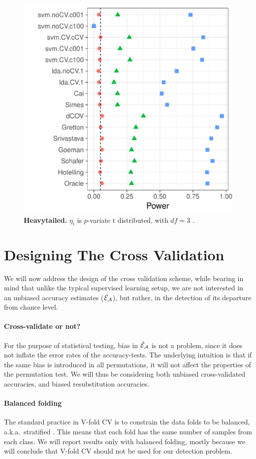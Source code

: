 \documentclass[oupdraft]{bio}
\begin{document}
\begin{figure}[th]
	\centering
	\includegraphics[width=0.5\columnwidth]{"file9"}
	\caption{\textbf{Heavytailed.} $\eta_i$ is $p$-variate t distributed, with $df=3$ .  } 
	\label{fig:t_null}
\end{figure}




\section{Designing The Cross Validation}

We will now address the design of the cross validation scheme, while bearing in mind that unlike the typical supervised learning setup, we are not interested in an unbiased accuracy estimates ($\mathcal{E}_{\mathcal{A}}$), but rather, in the detection of its departure from chance level. 

\paragraph{Cross-validate or not?}
For the purpose of statistical testing, bias in $\hat{\mathcal{E}}_{\mathcal{A}}$ is not a problem, since  it does not inflate the error rates of the accuracy-tests. 
The underlying intuition is that if the same bias is introduced in all permutations, it will not affect the properties of the permutation test. 
We will thus be considering both unbiased cross-validated accuracies, and biased resubstitution accuracies.


\paragraph{Balanced folding}
The standard practice in V-fold CV is to constrain the data folds to be balanced, a.k.a.\ stratified \cite[for example]{ojala_permutation_2010}.
This means that each fold has the same number of samples from each class. 
We will report results only with balanced folding, mostly because we will conclude that V-fold CV should not be used for our detection problem. 
\end{document}
